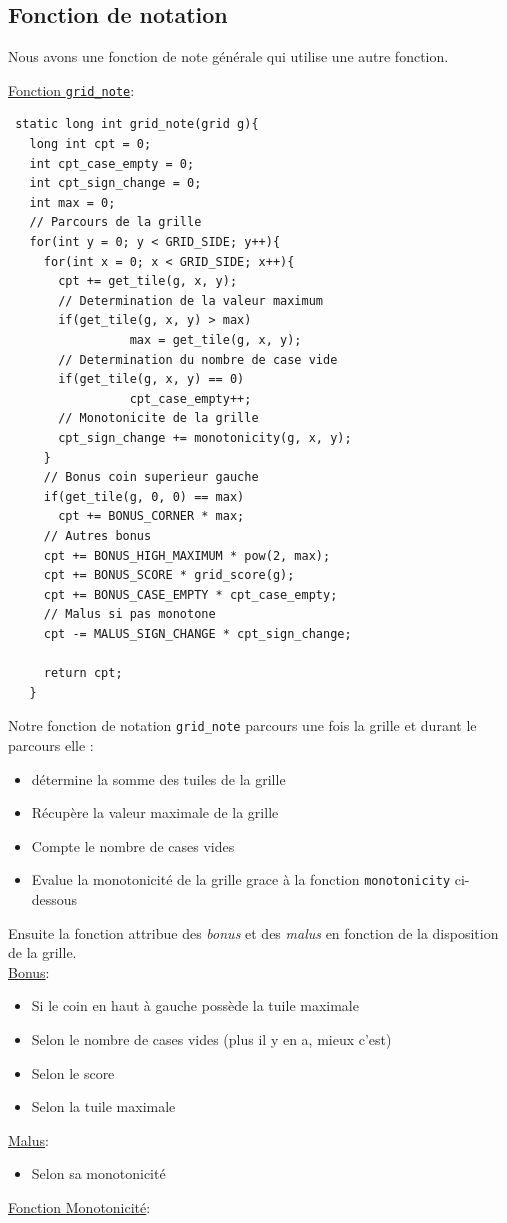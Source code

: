 \documentclass[a4paper]{article}
\begin{document}
 \vspace{0.5cm}


 \newpage
 \subsection{Fonction de notation}
 \label{sec-5-3}
 \noindent
 Nous avons une fonction de note générale qui utilise une autre fonction.

 \underline{Fonction \texttt{grid\_note}}:
 \begin{verbatim}
 static long int grid_note(grid g){
   long int cpt = 0;
   int cpt_case_empty = 0;
   int cpt_sign_change = 0;
   int max = 0;
   // Parcours de la grille
   for(int y = 0; y < GRID_SIDE; y++){
     for(int x = 0; x < GRID_SIDE; x++){
       cpt += get_tile(g, x, y);
       // Determination de la valeur maximum 
       if(get_tile(g, x, y) > max)
                 max = get_tile(g, x, y);
       // Determination du nombre de case vide
       if(get_tile(g, x, y) == 0)
                 cpt_case_empty++;
       // Monotonicite de la grille 
       cpt_sign_change += monotonicity(g, x, y);
     }
     // Bonus coin superieur gauche
     if(get_tile(g, 0, 0) == max)
       cpt += BONUS_CORNER * max;
     // Autres bonus
     cpt += BONUS_HIGH_MAXIMUM * pow(2, max);
     cpt += BONUS_SCORE * grid_score(g);
     cpt += BONUS_CASE_EMPTY * cpt_case_empty;
     // Malus si pas monotone
     cpt -= MALUS_SIGN_CHANGE * cpt_sign_change;

     return cpt;
   }
 \end{verbatim}

 Notre fonction de notation \texttt{grid\_note} parcours une fois la grille et durant le parcours elle :
 \begin{itemize}
 \item détermine la somme des tuiles de la grille
 \item Récupère la valeur maximale de la grille
 \item Compte le nombre de cases vides
 \item Evalue la monotonicité de la grille grace à la fonction \texttt{monotonicity} ci-dessous
 \end{itemize}



 Ensuite la fonction attribue des \emph{bonus} et des \emph{malus} en fonction de la disposition de la grille.\\
 \underline{Bonus}:
 \begin{itemize}
 \item Si le coin en haut à gauche possède la tuile maximale
 \item Selon le nombre de cases vides (plus il y en a, mieux c'est)
 \item Selon le score
 \item Selon la tuile maximale
 \end{itemize}
 \underline{Malus}:
 \begin{itemize}
 \item Selon sa monotonicité
 \end{itemize}
 \newpage
 \noindent
 \underline{Fonction Monotonicité}:
\end{document}
